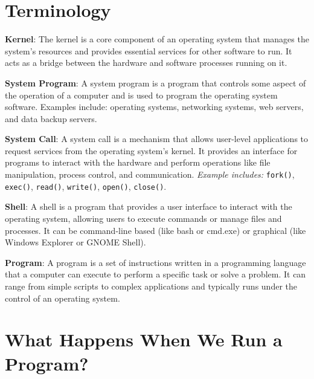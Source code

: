 \section{Terminology}

\textbf{Kernel}: The kernel is a core component of an operating system that manages the system's resources and provides essential services for other software to run. It acts as a bridge between the hardware and software processes running on it.

\textbf{System Program}: A system program is a program that controls some aspect of the operation of a computer and is used to program the operating system software. Examples include: operating systems, networking systems, web servers, and data backup servers.

\textbf{System Call}: A system call is a mechanism that allows user-level applications to request services from the operating system's kernel. It provides an interface for programs to interact with the hardware and perform operations like file manipulation, process control, and communication.
\textit{Example includes:} \texttt{fork()}, \texttt{exec()}, \texttt{read()}, \texttt{write()}, \texttt{open()}, \texttt{close()}.

\textbf{Shell}: A shell is a program that provides a user interface to interact with the operating system, allowing users to execute commands or manage files and processes. It can be command-line based (like bash or cmd.exe) or graphical (like Windows Explorer or GNOME Shell).

\textbf{Program}: A program is a set of instructions written in a programming language that a computer can execute to perform a specific task or solve a problem. It can range from simple scripts to complex applications and typically runs under the control of an operating system.

\section{What Happens When We Run a Program?}

